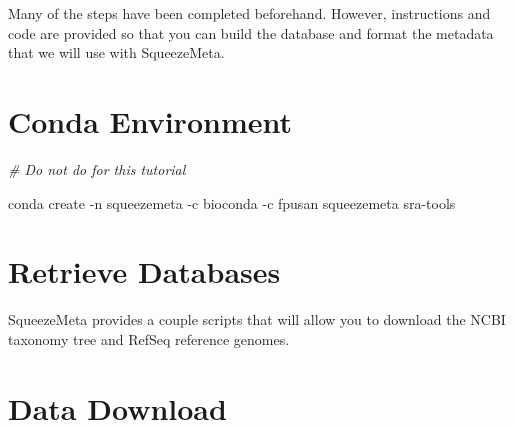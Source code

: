 \documentclass[
]{book}
\newenvironment{Shaded}{\begin{snugshade}}{\end{snugshade}}
\newcommand{\AttributeTok}[1]{\textcolor[rgb]{0.77,0.63,0.00}{#1}}
\newcommand{\BuiltInTok}[1]{#1}
\newcommand{\CommentTok}[1]{\textcolor[rgb]{0.56,0.35,0.01}{\textit{#1}}}
\newcommand{\ExtensionTok}[1]{#1}
\newcommand{\FunctionTok}[1]{\textcolor[rgb]{0.00,0.00,0.00}{#1}}
\newcommand{\NormalTok}[1]{#1}
\newcommand{\VariableTok}[1]{\textcolor[rgb]{0.00,0.00,0.00}{#1}}
\begin{document}
Many of the steps have been completed beforehand. However, instructions and code are provided so that you
can build the database and format the metadata that we will use with SqueezeMeta.

\hypertarget{conda-environment}{%
\section{Conda Environment}\label{conda-environment}}

\begin{Shaded}
\begin{Highlighting}[]
\CommentTok{\# Do not do for this tutorial}

\ExtensionTok{conda}\NormalTok{ create }\AttributeTok{{-}n}\NormalTok{ squeezemeta }\AttributeTok{{-}c}\NormalTok{ bioconda }\AttributeTok{{-}c}\NormalTok{ fpusan squeezemeta sra{-}tools}
\end{Highlighting}
\end{Shaded}

\hypertarget{retrieve-databases}{%
\section{Retrieve Databases}\label{retrieve-databases}}

SqueezeMeta provides a couple scripts that will allow you to download the NCBI taxonomy tree and RefSeq
reference genomes.

\begin{Shaded}
\end{Shaded}

\hypertarget{data-download-2}{%
\section{Data Download}\label{data-download-2}}
\end{document}
